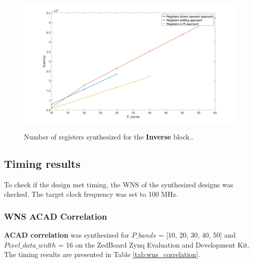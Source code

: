 \begin{figure}[H]

\hbox{\hspace*{-2cm}                                                           
   \includegraphics[scale=0.3]{images/syntese_resultat/inverse/number_of_registers.png}}
  \caption{Number of registers synthesized  for the \textbf{Inverse} block.. } 
  \label{fig:registers_inverse}
\end{figure}




%
%

\subsection{Timing results}
To check if the design met timing, the WNS of the synthesized designs was checked. The target clock frequency was set to 100 MHz. 
\subsubsection{WNS ACAD Correlation}
\textbf{ACAD correlation} was synthesized for $P\_bands$ = [10, 20, 30, 40, 50] and $Pixel\_data\_width$ = 16 on the ZedBoard Zynq Evaluation and Development Kit. The timing results are presented in Table \ref{tab:wns_correlation}.

